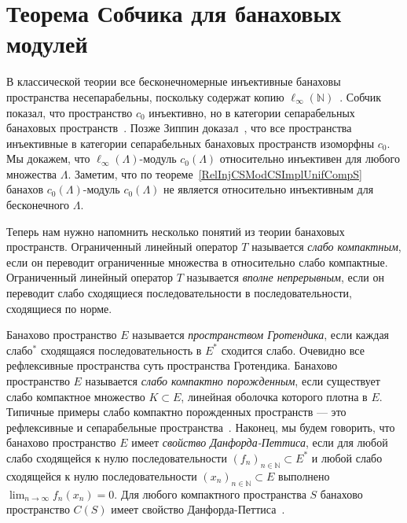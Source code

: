 \documentclass[12pt]{article}
\begin{document}
\section{Теорема Собчика для банаховых модулей}\label{SectionExamples}

В классической теории все бесконечномерные инъективные банаховы пространства
несепарабельны, поскольку содержат копию
$\ell_\infty(\mathbb{N})$~\cite[следствие 1.1.4]{RosOnRelDisjFamOfMeas}. Собчик
показал, что пространство $c_0$ инъективно, но в категории сепарабельных
банаховых пространств~\cite[теорема 5]{SobProjmOnc0}. Позже Зиппин
доказал~\cite{ZipSepExtProbm}, что все пространства инъективные в категории
сепарабельных банаховых пространств изоморфны $c_0$.  Мы докажем, что
$\ell_\infty(\Lambda)$-модуль $c_0(\Lambda)$ относительно инъективен для любого
множества $\Lambda$. Заметим, что по теореме~\ref{RelInjCSModCSImplUnifCompS}
банахов $c_0(\Lambda)$-модуль $c_0(\Lambda)$ не является относительно
инъективным для бесконечного $\Lambda$.

Теперь нам нужно напомнить несколько понятий из теории банаховых пространств.
Ограниченный линейный оператор $T$ называется \textit{слабо компактным}, если он
переводит ограниченные множества в относительно слабо компактные. Ограниченный
линейный оператор $T$ называется \textit{вполне непрерывным}, если он переводит
слабо сходящиеся последовательности в последовательности, сходящиеся по норме.

Банахово пространство $E$ называется \textit{пространством Гротендика}, если
каждая слабо$^*$ сходящаяся последовательность в $E^*$ сходится слабо. Очевидно
все рефлексивные пространства суть пространства Гротендика. Банахово
пространство $E$ называется \textit{слабо компактно порожденным}, если
существует слабо компактное множество $K\subset E$, линейная оболочка которого
плотна в $E$. Типичные примеры слабо компактно порожденных пространств --- это
рефлексивные и сепарабельные пространства~\cite[параграф 13.1]{FabHabBanSpTh}.
Наконец, мы будем говорить, что банахово пространство $E$ имеет \textit{свойство
    Данфорда-Петтиса}, если для любой слабо сходящейся к нулю последовательности
${(f_n)}_{n\in\mathbb{N}}\subset E^*$ и любой слабо сходящейся к нулю
последовательности ${(x_n)}_{n\in\mathbb{N}}\subset E$ выполнено
$\lim_{n\to\infty} f_n(x_n)=0$. Для любого компактного пространства $S$ банахово
пространство $C(S)$ имеет свойство Данфорда-Петтиса~\cite{DunfPetLinOpSumFunc}.
\end{document}
